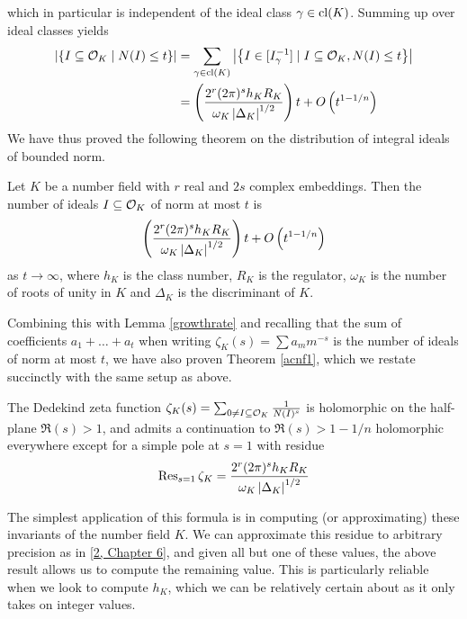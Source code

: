 \documentclass[11pt]{report}
\begin{document}
which in particular is independent of the ideal class $\gamma \in \operatorname{cl}(K)$. Summing up over ideal classes yields
\begin{align*}
    \left| \left\{  I \subseteq \mathcal{O}_K \mid N(I) \leq t  \right\} \right| &= \sum_{\gamma \in \operatorname{cl}(K)}\left| \left\{  I \in [I_{\gamma}^{-1}] \mid I \subseteq \mathcal{O}_K, N(I) \leq t  \right\} \right| \\ 
    &= \left(  \frac{2^r(2\pi)^s h_KR_K}{\omega_K \left| \Delta_K \right|^{1/2}}  \right)t + O\left(  t^{1 - 1/n}  \right)
\end{align*}
We have thus proved the following theorem on the distribution of integral ideals of bounded norm.
\begin{theorem}[]
    Let $K$ be a number field with $r$ real and $2s$ complex embeddings. Then the number of ideals $I \subseteq \mathcal{O}_K$ of norm at most $t$ is
    $$
        \left(  \frac{2^r(2\pi)^s h_KR_K}{\omega_K\left| \Delta_K \right|^{1/2}}  \right)t + O\left(  t^{1 - 1/n}  \right)
    $$
    as $t \to \infty$, where $h_K$ is the class number, $R_K$ is the regulator, $\omega_K$ is the number of roots of unity in $K$ and $\Delta_K$ is the discriminant of $K$.
\end{theorem}
Combining this with Lemma \ref{growthrate} and recalling that the sum of coefficients $a_1 + \ldots + a_t$ when writing $\zeta_K(s) = \sum a_mm^{-s}$ is the number of ideals of norm at most $t$, we have also proven Theorem \ref{acnf1}, which we restate succinctly with the same setup as above.
\begin{theorem}
    The Dedekind zeta function $\zeta_K(s) = \sum_{0 \neq I \subseteq \mathcal{O}_K} \frac{1}{N(I)^s}$ is holomorphic on the half-plane $\Re(s) > 1$, and admits a continuation to $\Re(s) > 1 - 1/n$ holomorphic everywhere except for a simple pole at $s = 1$ with residue
    $$
        \operatorname{Res}_{s = 1}\zeta_K = \frac{2^r(2\pi)^sh_KR_K}{\omega_K\left| \Delta_K \right|^{1/2}}
    $$
\end{theorem}
The simplest application of this formula is in computing (or approximating) these invariants of the number field $K$. We can approximate this residue to arbitrary precision as in \hyperlink{stevenhagen}{[2, Chapter 6]}, and given all but one of these values, the above result allows us to compute the remaining value. This is particularly reliable when we look to compute $h_K$, which we can be relatively certain about as it only takes on integer values.
\end{document}
